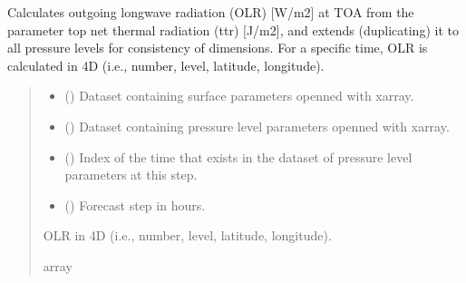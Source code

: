 \documentclass[a4paper,11pt,english]{sphinxmanual}
\begin{document}

\begin{fulllineitems}
\label{\detokenize{modules:climaccf.processing_surf_vars.extend_olr_pl_5d}}
\pysigstartsignatures
{}
\pysigstopsignatures
\sphinxAtStartPar
Calculates outgoing longwave radiation (OLR) {[}W/m2{]} at TOA from the parameter top net thermal radiation (ttr)
{[}J/m2{]}, and extends (duplicating) it to all pressure levels for consistency of dimensions. For a specific time, OLR is calculated in 4D (i.e., number, level, latitude, longitude).
\begin{quote}\begin{description}
\begin{itemize}
\item {} 
\sphinxAtStartPar
{} () \textendash{} Dataset containing surface parameters openned with xarray.

\item {} 
\sphinxAtStartPar
{} () \textendash{} Dataset containing pressure level parameters openned with xarray.

\item {} 
\sphinxAtStartPar
{} () \textendash{} Index of the time that exists in the dataset of pressure level parameters at this step.

\item {} 
\sphinxAtStartPar
{} () \textendash{} Forecast step in hours.

\end{itemize}

\sphinxAtStartPar
OLR in 4D (i.e., number, level, latitude, longitude).

\sphinxAtStartPar
array

\end{description}\end{quote}

\end{fulllineitems}
\end{document}

